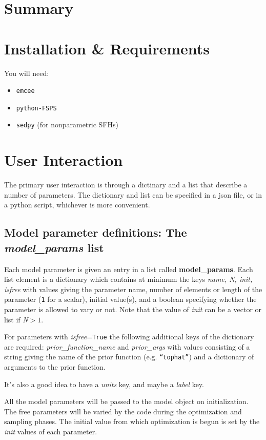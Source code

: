 

\section{Summary}

\section{Installation \& Requirements}
You will need:

\begin{itemize}
\item \texttt{emcee}
\item \texttt{python-FSPS}
\item \texttt{sedpy} (for nonparametric SFHs)
\end{itemize}

\section{User Interaction}
The primary user interaction is through a dictinary and a list that describe a number of parameters.  The dictionary and list can be specified in a json file, or in a python script, whichever is more convenient.

\subsection{Model parameter definitions: The \emph{model_params} list}
Each model parameter is given an entry in a list called {\bf model_params}. Each list element is a dictionary which contains at minimum the keys {\it name, N, init, isfree} with values giving the parameter name, number of elements or length of the parameter (\texttt{1} for a scalar), initial value(s), and a boolean specifying whether the parameter is allowed to vary or not.  Note that the value of {\it init} can be a vector or list if {\it N}$>1$.

For parameters with {\it isfree}=\texttt{True} the following additional keys of the dictionary are required: {\it prior_function_name} and {\it prior_args} with values consisting of a string giving the name of the prior function (e.g. \texttt{``tophat''}) and a dictionary of arguments to the prior function.

It's also a good idea to have a {\it units} key, and maybe a {\it label} key.

All the model parameters will be passed to the model object on initialization.  The free parameters will be varied by the code during the optimization and sampling phases.  The initial value from which optimization is begun is set by the {\it init} values of each parameter.

